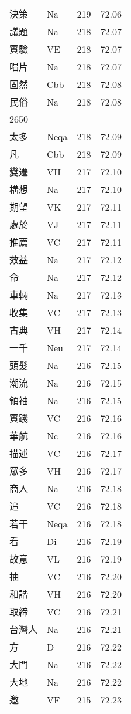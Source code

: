 \documentclass[twocolumn]{book}
\begin{document}
\begin{supertabular}{llrr}
決策 & Na & 219 &  72.06\\
議題 & Na & 218 &  72.07\\
實驗 & VE & 218 &  72.07\\
唱片 & Na & 218 &  72.07\\
固然 & Cbb & 218 &  72.08\\
民俗 & Na & 218 &  72.08\\
2650\\
太多 & Neqa & 218 &  72.09\\
凡 & Cbb & 218 &  72.09\\
變遷 & VH & 217 &  72.10\\
構想 & Na & 217 &  72.10\\
期望 & VK & 217 &  72.11\\
處於 & VJ & 217 &  72.11\\
推薦 & VC & 217 &  72.11\\
效益 & Na & 217 &  72.12\\
命 & Na & 217 &  72.12\\
車輛 & Na & 217 &  72.13\\
收集 & VC & 217 &  72.13\\
古典 & VH & 217 &  72.14\\
一千 & Neu & 217 &  72.14\\
頭髮 & Na & 216 &  72.15\\
潮流 & Na & 216 &  72.15\\
領袖 & Na & 216 &  72.15\\
實踐 & VC & 216 &  72.16\\
華航 & Nc & 216 &  72.16\\
描述 & VC & 216 &  72.17\\
眾多 & VH & 216 &  72.17\\
商人 & Na & 216 &  72.18\\
追 & VC & 216 &  72.18\\
若干 & Neqa & 216 &  72.18\\
看 & Di & 216 &  72.19\\
故意 & VL & 216 &  72.19\\
抽 & VC & 216 &  72.20\\
和諧 & VH & 216 &  72.20\\
取締 & VC & 216 &  72.21\\
台灣人 & Na & 216 &  72.21\\
方 & D & 216 &  72.22\\
大門 & Na & 216 &  72.22\\
大地 & Na & 216 &  72.22\\
邀 & VF & 215 &  72.23\\

\end{supertabular}
\end{document}
